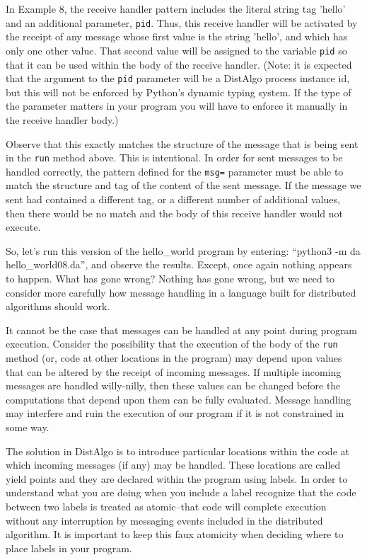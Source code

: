 \documentclass[11pt]{article}
\begin{document}
In Example 8, the receive handler pattern includes the literal string tag
'hello' and an additional parameter, \texttt{pid}. Thus, this receive
handler will be activated by the receipt of any message whose first value is
the string 'hello', and which has only one other value. That second value will
be assigned to the variable \texttt{pid} so that it can be used within the body
of the receive handler. (Note: it is expected that the argument to the 
\texttt{pid} parameter will be a DistAlgo process instance id, but this will
not be enforced by Python's dynamic typing system. If the type of the parameter
matters in your program you will have to enforce it manually in the receive
handler body.)

Observe that this exactly matches the structure of the message that is being
sent in the \texttt{run} method above. This is intentional. In order for sent
messages to be handled correctly, the pattern defined for the \texttt{msg=}
parameter must be able to match the structure and tag of the content of the
sent message. If the message we sent had contained a different tag, or a
different number of additional values, then there would be no match and the
body of this receive handler would not execute.

So, let's run this version of the hello_world program by entering: 
``python3 -m da hello_world08.da'', and observe the results. Except, once again
nothing appears to happen. What has gone wrong? Nothing has gone wrong, but we 
need to consider more carefully how message handling in a language built for
distributed algorithms should work.

It cannot be the case that messages can be handled at any point during program 
execution. Consider the possibility that the execution of the body of the 
\texttt{run} method (or, code at other locations in the program) may depend
upon values that can be altered by the receipt of incoming messages. If 
multiple incoming messages are handled willy-nilly, then these values can be
changed before the computations that depend upon them can be fully evaluated.
Message handling may interfere and ruin the execution of our program if it is
not constrained in some way.

The solution in DistAlgo is to introduce particular locations within the code
at which incoming messages (if any) may be handled. These locations are called
yield points and they are declared within the program using labels. In order to
understand what you are doing when you include a label recognize that the code
between two labels is treated as atomic--that code will complete execution 
without any interruption by messaging events included in the distributed 
algorithm. It is important to keep this faux atomicity when deciding where to 
place labels in your program.
\end{document}
